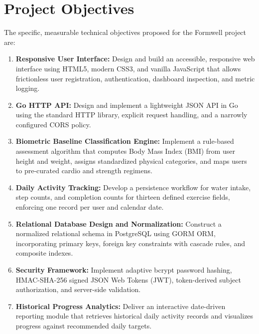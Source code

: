 \documentclass[11pt,a4paper]{report}
\begin{document}
\section{Project Objectives}
The specific, measurable technical objectives proposed for the Formwell project are:
\begin{enumerate}
  \item \textbf{Responsive User Interface:} Design and build an accessible, responsive web interface using HTML5, modern CSS3, and vanilla JavaScript that allows frictionless user registration, authentication, dashboard inspection, and metric logging.
  \item \textbf{Go HTTP API:} Design and implement a lightweight JSON API in Go using the standard HTTP library, explicit request handling, and a narrowly configured CORS policy.
  \item \textbf{Biometric Baseline Classification Engine:} Implement a rule-based assessment algorithm that computes Body Mass Index (BMI) from user height and weight, assigns standardized physical categories, and maps users to pre-curated cardio and strength regimens.
  \item \textbf{Daily Activity Tracking:} Develop a persistence workflow for water intake, step counts, and completion counts for thirteen defined exercise fields, enforcing one record per user and calendar date.
  \item \textbf{Relational Database Design and Normalization:} Construct a normalized relational schema in PostgreSQL using GORM ORM, incorporating primary keys, foreign key constraints with cascade rules, and composite indexes.
  \item \textbf{Security Framework:} Implement adaptive bcrypt password hashing, HMAC-SHA-256 signed JSON Web Tokens (JWT), token-derived subject authorization, and server-side validation.
  \item \textbf{Historical Progress Analytics:} Deliver an interactive date-driven reporting module that retrieves historical daily activity records and visualizes progress against recommended daily targets.
\end{enumerate}
\end{document}
